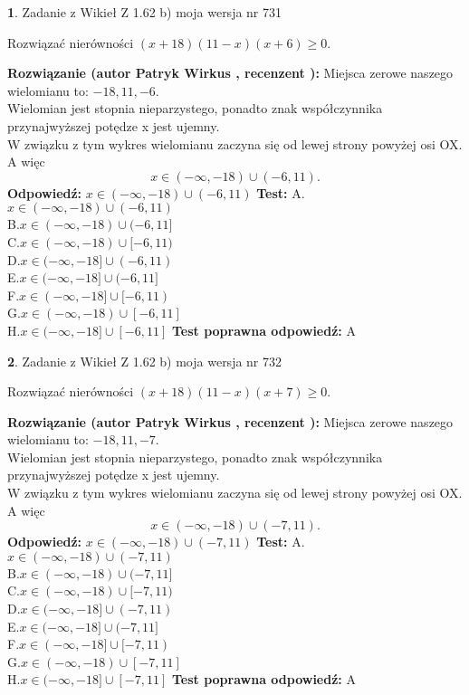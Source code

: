 \documentclass[12pt, a4paper]{article}
\theoremstyle{definition} %
\newtheorem{zad}{}
\newcommand{\zadStart}[1]{\begin{zad}#1\newline}
\newcommand{\zadStop}{\end{zad}}
\newcommand{\rozwStart}[2]{\noindent \textbf{Rozwiązanie (autor #1 , recenzent #2): }\newline}
\newcommand{\rozwStop}{\newline}
\newcommand{\odpStart}{\noindent \textbf{Odpowiedź:}\newline}
\newcommand{\odpStop}{\newline}
\newcommand{\testStart}{\noindent \textbf{Test:}\newline}
\newcommand{\testStop}{\newline}
\newcommand{\kluczStart}{\noindent \textbf{Test poprawna odpowiedź:}\newline}
\newcommand{\kluczStop}{\newline}
\begin{document}
\zadStart{Zadanie z Wikieł Z 1.62 b) moja wersja nr 731}

Rozwiązać nierówności $(x+18)(11-x)(x+6)\ge0$.
\zadStop
\rozwStart{Patryk Wirkus}{}
Miejsca zerowe naszego wielomianu to: $-18, 11, -6$.\\
Wielomian jest stopnia nieparzystego, ponadto znak współczynnika przy\linebreak najwyższej potędze x jest ujemny.\\ W związku z tym wykres wielomianu zaczyna się od lewej strony powyżej osi OX. A więc $$x \in (-\infty,-18) \cup (-6,11).$$
\rozwStop
\odpStart
$x \in (-\infty,-18) \cup (-6,11)$
\odpStop
\testStart
A.$x \in (-\infty,-18) \cup (-6,11)$\\
B.$x \in (-\infty,-18) \cup (-6,11]$\\
C.$x \in (-\infty,-18) \cup [-6,11)$\\
D.$x \in (-\infty,-18] \cup (-6,11)$\\
E.$x \in (-\infty,-18] \cup (-6,11]$\\
F.$x \in (-\infty,-18] \cup [-6,11)$\\
G.$x \in (-\infty,-18) \cup [-6,11]$\\
H.$x \in (-\infty,-18] \cup [-6,11]$
\testStop
\kluczStart
A
\kluczStop



\zadStart{Zadanie z Wikieł Z 1.62 b) moja wersja nr 732}

Rozwiązać nierówności $(x+18)(11-x)(x+7)\ge0$.
\zadStop
\rozwStart{Patryk Wirkus}{}
Miejsca zerowe naszego wielomianu to: $-18, 11, -7$.\\
Wielomian jest stopnia nieparzystego, ponadto znak współczynnika przy\linebreak najwyższej potędze x jest ujemny.\\ W związku z tym wykres wielomianu zaczyna się od lewej strony powyżej osi OX. A więc $$x \in (-\infty,-18) \cup (-7,11).$$
\rozwStop
\odpStart
$x \in (-\infty,-18) \cup (-7,11)$
\odpStop
\testStart
A.$x \in (-\infty,-18) \cup (-7,11)$\\
B.$x \in (-\infty,-18) \cup (-7,11]$\\
C.$x \in (-\infty,-18) \cup [-7,11)$\\
D.$x \in (-\infty,-18] \cup (-7,11)$\\
E.$x \in (-\infty,-18] \cup (-7,11]$\\
F.$x \in (-\infty,-18] \cup [-7,11)$\\
G.$x \in (-\infty,-18) \cup [-7,11]$\\
H.$x \in (-\infty,-18] \cup [-7,11]$
\testStop
\kluczStart
A
\kluczStop
\end{document}

